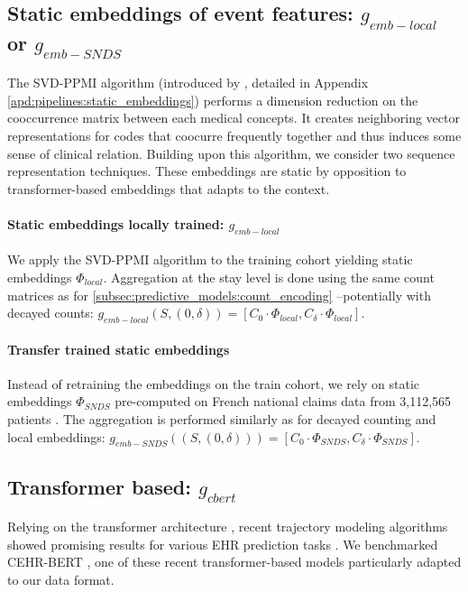 \documentclass[french,12pt,twoside,a4paper]{book}
\begin{document}
\subsection{Static embeddings of event features: $g_{emb-local}$ or $g_{emb-SNDS}$}

The SVD-PPMI algorithm (introduced by \cite{beam2018big}, detailed in Appendix
\ref{apd:pipelines:static_embeddings}) performs a dimension reduction on the
cooccurrence matrix between each medical concepts. It creates neighboring vector
representations for codes that coocurre frequently together and thus induces
some sense of clinical relation. Building upon this algorithm, we consider two
sequence representation techniques. These embeddings are static by opposition to
transformer-based embeddings that adapts to the context.

\paragraph{Static embeddings locally trained: $g_{emb-local}$} We apply the
SVD-PPMI algorithm to the training cohort yielding static embeddings
$\Phi_{local}$. Aggregation at the stay level is done using the same
count matrices as for \ref{subsec:predictive_models:count_encoding} --potentially
with decayed counts: $g_{emb-local}(S, (0, \delta))=[C_{0} \cdot \Phi_{local}, C_{\delta} \cdot \Phi_{local}]$.

\paragraph{Transfer trained static embeddings} Instead of retraining the
embeddings on the train cohort, we rely on static embeddings $\Phi_{SNDS}$
pre-computed on French national claims data from 3,112,565 patients
\citep{doutrelignerepresentations}. The aggregation is performed similarly as
for decayed counting and local embeddings: $g_{emb-SNDS}((S, (0, \delta))) = [C_{0} \cdot \Phi_{SNDS}, C_{\delta} \cdot
  \Phi_{SNDS}]$.

\subsection{Transformer based: $g_{cbert}$}%
\label{subsec:predictive_models:transformer}%

Relying on the transformer architecture \citep{vaswani2017attention}, recent
trajectory modeling algorithms showed promising results for various EHR
prediction tasks \citep{li2020behrt, rasmy2021med,pang2021cehr}. We benchmarked CEHR-BERT
\citep{pang2021cehr}, one of these recent transformer-based models particularly
adapted to our data format.
\end{document}
